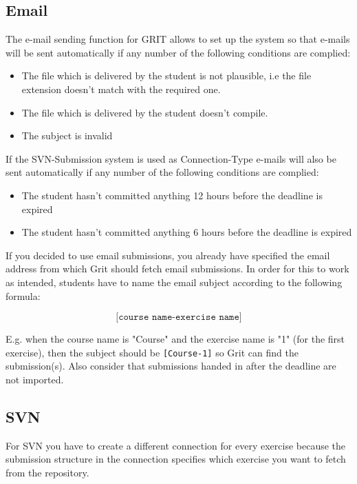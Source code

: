 \documentclass[10pt,a4paper, titlepage, toc=idx]{scrreprt}
\theoremstyle{definition}
\theoremstyle{plain}
\newcommand*{\product}{Grit}
\begin{document}
\subsection{Email}
The e-mail sending function for GRIT allows to set up the system so that e-mails will be sent automatically if any number of the following conditions are complied:
\begin{itemize}
	\item The file which is delivered by the student is not plausible, i.e the file extension doesn't match with the required one.
	\item The file which is delivered by the student doesn't compile.
	\item The subject is invalid
\end{itemize}
If the SVN-Submission system is used as Connection-Type e-mails will also be sent automatically if any number of the following conditions are complied:
\begin{itemize}
\item The student hasn't committed anything 12 hours before the deadline is expired
\item The student hasn't committed anything 6 hours before the deadline is expired
\end{itemize}

If you decided to use email submissions, you already have specified the email address from which \product{} should fetch email submissions. In order for this to work as intended, students have to name the email subject according to the following formula:

       \[ \texttt{[course name-exercise name]} \]

E.g. when the course name is "Course" and the exercise name is "1" (for the first exercise), then the subject should be \texttt{[Course-1]} so \product{} can find the submission(s). Also consider that submissions handed in after the deadline are not imported.
\subsection{SVN}

For SVN you have to create a different connection for every exercise because the submission structure in the connection specifies which exercise you want to fetch from the repository.\\




      
        
\end{document}

